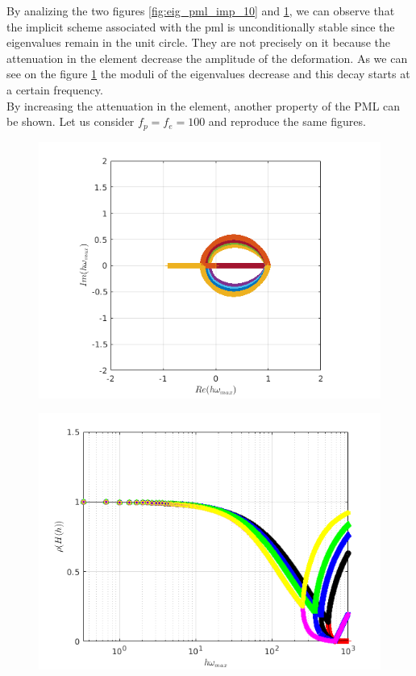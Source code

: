 \begin{itemize}
\begin{figure}[H]
\begin{minipage}{.5\textwidth}
  \label{fig:spect_rad_pml_imp_10}
\end{minipage}
\end{figure} 
By analizing the two figures \ref{fig:eig_pml_imp_10} and \ref{fig:spect_rad_pml_imp_10}, we can observe that the implicit scheme associated with the pml is unconditionally stable since the eigenvalues remain in the unit circle. They are not precisely on it because the attenuation in the element decrease the amplitude of the deformation. As we can see on the figure \ref{fig:spect_rad_pml_imp_10} the moduli of the eigenvalues decrease and this decay starts at a certain frequency.\\
By increasing the attenuation in the element, another property of the PML can be shown. Let us consider $f_p = f_e = 100$ and reproduce the same figures. 
\begin{figure}[H]
\centering
\begin{minipage}{.5\textwidth}
  \centering
  \includegraphics[width=1.\linewidth]{images/eig_pml_imp_100.png}
  \label{fig:eig_pml_imp_100}
\end{minipage}%
\begin{minipage}{.5\textwidth}
  \centering
  \includegraphics[width=1.\linewidth]{images/spect_rad_pml_imp_100.png}

\end{minipage}
\end{figure}
\end{itemize}
